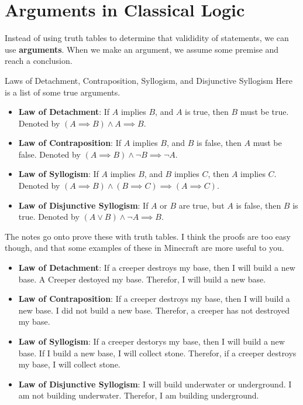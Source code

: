 \section{Arguments in Classical Logic}

Instead of using truth tables to determine that valididity of statements, we can use {\bf arguments}. When we make an argument, we assume some premise and reach a conclusion.

\begin{boxdefine}{Laws of Detachment, Contraposition, Syllogism, and Disjunctive Syllogism}{}
	Here is a list of some true arguments.

	\begin{itemize}
		\item {\bf Law of Detachment}: If $A$ implies $B$, and $A$ is true, then $B$ must be true. Denoted by $(A \implies B) \land A \implies B.$
		\item {\bf Law of Contraposition}: If $A$ implies $B$, and $B$ is false, then $A$ must be false. Denoted by $(A \implies B) \land \lnot B \implies \lnot A.$
		\item {\bf Law of Syllogism}: If $A$ implies $B$, and $B$ implies $C$, then $A$ implies $C$. Denoted by $(A \implies B) \land (B \implies C) \implies (A \implies C).$
		\item {\bf Law of Disjunctive Syllogism}: If $A$ or $B$ are true, but $A$ is false, then $B$ is true. Denoted by $(A \lor B) \land \lnot A \implies B$.
	\end{itemize}
\end{boxdefine}

The notes go onto prove these with truth tables. I think the proofs are too easy though, and that some examples of these in  Minecraft are more useful to you.

\begin{boxexample}{}{}
	\begin{itemize}
		\item {\bf Law of Detachment}: If a creeper destroys my base, then I will build a new base. A Creeper destoyed my base. Therefor, I will build a new base.
		\item {\bf Law of Contraposition}: If a creeper destroys my base, then I will build a new base. I did not build a new base. Therefor, a creeper has not destroyed my base.
		\item {\bf Law of Syllogism}: If a creeper destorys my base, then I will build a new base. If I build a new base, I will collect stone. Therefor, if a creeper destroys my base, I will collect stone.
		\item {\bf Law of Disjunctive Syllogism}: I will build underwater or underground. I am not building underwater. Therefor, I am building underground.
	\end{itemize}
\end{boxexample}

